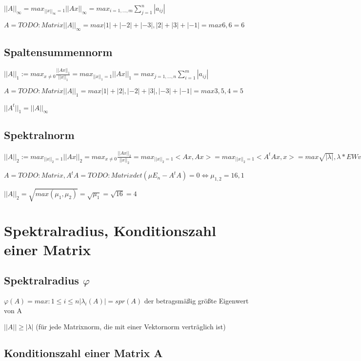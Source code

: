 \documentclass[12pt,a4paper]{article} %
\begin{document}
		$||A||_\infty = max_{||x||_\infty = 1} ||Ax||_\infty = max_{i = 1, ..., m} \sum_{j = 1}^{n} |a_{ij}|$
		
		$A = TODO: Matrix  ||A||_\infty = max{|1| + |-2| + |-3|, |2| + |3| + |-1|} = max{6, 6} = 6$
		
		\subsection{Spaltensummennorm}
		
		$||A||_1 := max_{x \ne 0} \frac{||Ax||_1}{||x||_1} = max_{||x||_1 = 1} ||Ax||_1 = max_{j = 1, ..., n} \sum_{i = 1}^{m}|a_{ij}|$
		
		$A = TODO: Matrix  ||A||_1 = max{|1| + |2|, |-2| + |3|, |-3| + |-1|} = max{3, 5, 4} = 5$
		
		$||A^t||_1 = ||A||_\infty$
		
		\subsection{Spektralnorm}
		
		$||A||_2 := max_{||x||_2 = 1} ||Ax||_2 = max_{x \ne 0} \frac{||Ax||_2}{||x||_2} = max_{||x||_2 = 1} <Ax, Ax> = max_{||x||_2 = 1} <A^tAx, x> = max{\sqrt{|\lambda |}, \lambda * EW von A^tA}$
		
		$A = TODO: Matrix  , A^tA = TODO: Matrix    det(\mu E_n - A^tA) = 0 \Leftrightarrow \mu_{1, 2} = {16, 1}$
		
		$||A||_2 = \sqrt{max(\mu_1, \mu_2)} = \sqrt{\mu_1} = \sqrt{16} = 4$
		
		\newpage
		
		\section{Spektralradius, Konditionszahl einer Matrix}
		
		\subsection{Spektralradius $\varphi$}
		
		$\varphi(A) = max:{1 \le i \le n} |\lambda_i(A)| = spr(A)$ der betragsmäßig größte Eigenwert von A
		
		$||A|| \ge |\lambda|$ (für jede Matrixnorm, die mit einer Vektornorm verträglich ist)
		
		\subsection{Konditionszahl einer Matrix A}
		
\end{document}
